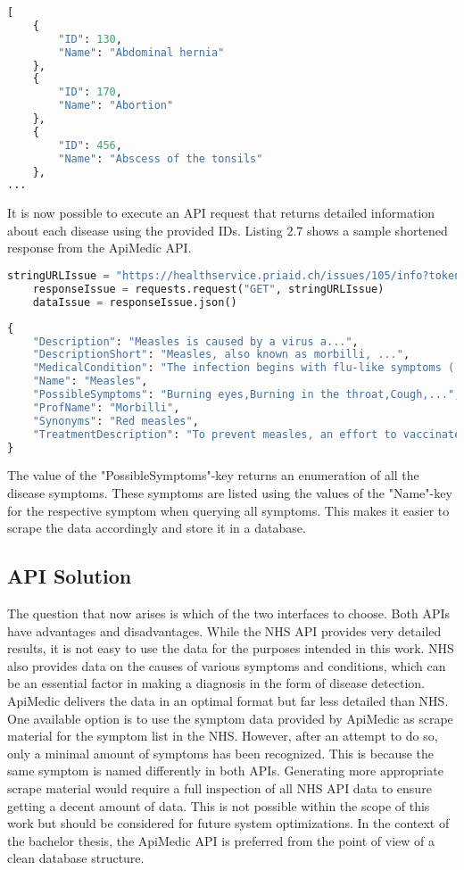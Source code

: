 \begin{lstlisting}[language=Python, caption={Response for the ApiMedic API (all issues)}]
[
	{
		"ID": 130,
		"Name": "Abdominal hernia"	
	},
	{
		"ID": 170,
		"Name": "Abortion"	
	},
	{
		"ID": 456,
		"Name": "Abscess of the tonsils"	
	},
...
\end{lstlisting}
It is now possible to execute an API request that returns detailed information about each disease using the provided IDs. Listing 2.7 shows a sample shortened response from the ApiMedic API.
\begin{lstlisting}[language=Python, caption={Example Python Request for the ApiMedic API (single issue)}]
	stringURLIssue = "https://healthservice.priaid.ch/issues/105/info?token=YOUR_TOKEN"
	responseIssue = requests.request("GET", stringURLIssue)
	dataIssue = responseIssue.json()
\end{lstlisting}

\begin{lstlisting}[language=Python, caption={Response for the ApiMedic API (single issue)}]
{
	"Description": "Measles is caused by a virus a...",
	"DescriptionShort": "Measles, also known as morbilli, ...",
	"MedicalCondition": "The infection begins with flu-like symptoms ( ...",
	"Name": "Measles",
	"PossibleSymptoms": "Burning eyes,Burning in the throat,Cough,...",
	"ProfName": "Morbilli",
	"Synonyms": "Red measles",
	"TreatmentDescription": "To prevent measles, an effort to vaccinate ..."
}
\end{lstlisting}
\noindent 
The value of the "PossibleSymptoms"-key returns an enumeration of all the disease symptoms. These symptoms are listed using the values of the "Name"-key for the respective symptom when querying all symptoms. This makes it easier to scrape the data accordingly and store it in a database.

\subsection{API Solution}
The question that now arises is which of the two interfaces to choose. Both APIs have advantages and disadvantages. While the NHS API provides very detailed results, it is not easy to use the data for the purposes intended in this work. NHS also provides data on the causes of various symptoms and conditions, which can be an essential factor in making a diagnosis in the form of disease detection. ApiMedic delivers the data in an optimal format but far less detailed than NHS. One available option is to use the symptom data provided by ApiMedic as scrape material for the symptom list in the NHS. However, after an attempt to do so, only a minimal amount of symptoms has been recognized. This is because the same symptom is named differently in both APIs. Generating more appropriate scrape material would require a full inspection of all NHS API data to ensure getting a decent amount of data. This is not possible within the scope of this work but should be considered for future system optimizations. In the context of the bachelor thesis, the ApiMedic API is preferred from the point of view of a clean database structure.

